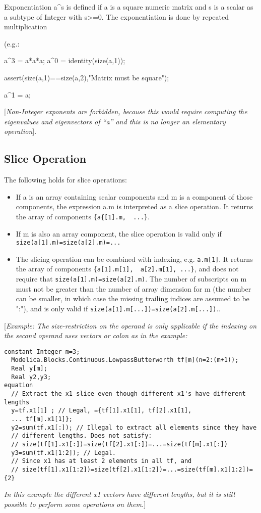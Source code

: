 Exponentiation a\^{}s is defined if a is a square numeric matrix and s
is a scalar as a subtype of Integer with s\textgreater{}=0. The
exponentiation is done by repeated multiplication

(e.g.:

a\^{}3 = a*a*a; a\^{}0 = identity(size(a,1));

assert(size(a,1)==size(a,2),"Matrix must be square");

a\^{}1 = a;

{[}\emph{Non-Integer exponents are forbidden, because this would require
computing the eigenvalues and eigenvectors of ``a'' and this is no
longer an elementary operation}{]}.

\subsection{Slice Operation}

The following holds for slice operations:

\begin{itemize}
\item
  If a is an array containing scalar components and m is a component of
  those components, the expression a.m is interpreted as a slice operation. It returns the array of components \lstinline!{a{[1].m,  ...}!.
\item
  If m is also an array component, the slice operation is valid only if \lstinline!size(a[1].m)=size(a[2].m)=...!
\item
  The slicing operation can be combined with indexing, e.g. \lstinline!a.m[1]!.
  It returns the array of components  \lstinline!{a[1].m[1],  a[2].m[1], ...}!, and does not require that
   \lstinline!size(a[1].m)=size(a[2].m)!. The number of subscripts on m must
  not be greater than the number of array dimension for m (the number
  can be smaller, in which case the missing trailing indices are assumed
  to be ":"), and is only valid if   \lstinline!size(a[1].m[...])=size(a[2].m[...])!..
\end{itemize}

{[}\emph{Example: The size-restriction on the operand is only applicable
if the indexing on the second operand uses vectors or colon as in the
example:}

\begin{lstlisting}[language=modelica]
  constant Integer m=3;
  Modelica.Blocks.Continuous.LowpassButterworth tf[m](n=2:(m+1));
  Real y[m];
  Real y2,y3;
equation
  // Extract the x1 slice even though different x1's have different lengths
  y=tf.x1[1] ; // Legal, ={tf[1].x1[1], tf[2].x1[1],
  ... tf[m].x1[1]};
  y2=sum(tf.x1[:]); // Illegal to extract all elements since they have
  // different lengths. Does not satisfy:
  // size(tf[1].x1[:])=size(tf[2].x1[:])=...=size(tf[m].x1[:])
  y3=sum(tf.x1[1:2]); // Legal.
  // Since x1 has at least 2 elements in all tf, and
  // size(tf[1].x1[1:2])=size(tf[2].x1[1:2])=...=size(tf[m].x1[1:2])={2}
\end{lstlisting}
\emph{In this example the different x1 vectors have different lengths,
but it is still possible to perform some operations on them.}{]}

